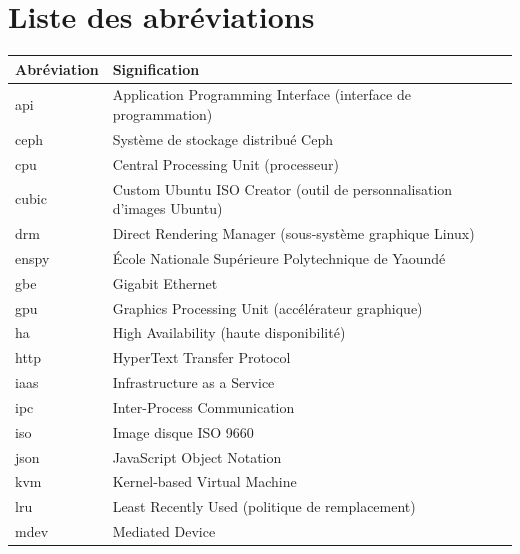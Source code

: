 \documentclass[
    language=french,
    school=estg,
    docstage=final,
    media=paper,
    bookprint=false,
    linkcolor=red!45!black,
    chapterstyle=classic,
    coverstyle=classic,
    aiacknowledgement=false,
    listprefix=false
]{IPLeiriaThesis}
\theoremstyle{definition}
\theoremstyle{plain}
\begin{document}

\tableofcontents
\listoffigures
\listoftables


\chapter*{Liste des abréviations}

\begin{longtable}{lp{11cm}}
\toprule
\textbf{Abréviation} & \textbf{Signification} \\
\midrule
\endhead
\acrshort{api}    & Application Programming Interface (interface de programmation) \\
\acrshort{ceph}   & Système de stockage distribué Ceph \\
\acrshort{cpu}    & Central Processing Unit (processeur) \\
\acrshort{cubic}  & Custom Ubuntu ISO Creator (outil de personnalisation d'images Ubuntu) \\
\acrshort{drm}    & Direct Rendering Manager (sous-système graphique Linux) \\
\acrshort{enspy}  & École Nationale Supérieure Polytechnique de Yaoundé \\
\acrshort{gbe}    & Gigabit Ethernet \\
\acrshort{gpu}    & Graphics Processing Unit (accélérateur graphique) \\
\acrshort{ha}     & High Availability (haute disponibilité) \\
\acrshort{http}   & HyperText Transfer Protocol \\
\acrshort{iaas}   & Infrastructure as a Service \\
\acrshort{ipc}    & Inter-Process Communication \\
\acrshort{iso}    & Image disque ISO 9660 \\
\acrshort{json}   & JavaScript Object Notation \\
\acrshort{kvm}    & Kernel-based Virtual Machine \\
\acrshort{lru}    & Least Recently Used (politique de remplacement) \\
\acrshort{mdev}   & Mediated Device \\

\end{longtable}
\end{document}
